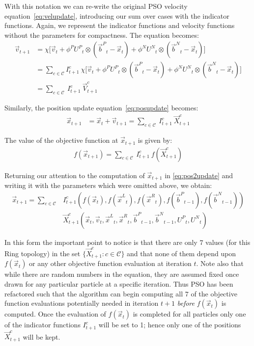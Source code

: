 \documentclass[ms]{byuprop}
\providecommand{\pers}{\ensuremath{P}}
\providecommand{\neigh}{\ensuremath{N}}
\providecommand{\leftind}{\ensuremath{L}}
\providecommand{\rightind}{\ensuremath{R}}
\providecommand{\nURand}{\ensuremath{U^\neigh}}
\providecommand{\pURand}{\ensuremath{U^\pers}}
\providecommand{\ppos}{\ensuremath{\Vec{x}}}
\providecommand{\pvel}{\ensuremath{\Vec{v}}}
\providecommand{\nbest}{\ensuremath{\Vec{b}^\neigh}}
\providecommand{\pbest}{\ensuremath{\Vec{b}^\pers}}
\providecommand{\constriction}{\ensuremath{\chi}}
\providecommand{\ncoeff}{\ensuremath{\phi^\neigh}}
\providecommand{\pcoeff}{\ensuremath{\phi^\pers}}
\providecommand{\ofunc}{\ensuremath{f}}
\providecommand{\indic}{\ensuremath{I}}
\providecommand{\specvel}{\ensuremath{\vec{V}}}
\providecommand{\specpos}{\ensuremath{\vec{X}}}
\providecommand{\leftn}{\ensuremath{\Vec{x}^\leftind}}
\providecommand{\rightn}{\ensuremath{\Vec{x}^\rightind}}
\providecommand{\caseset}{\ensuremath{\mathcal{C}}}
\providecommand{\casegen}{\ensuremath{c}}
\begin{document}
With this notation we can re-write the original PSO velocity
equation~\eqref{eq:velupdate}, introducing our sum over cases with the
indicator functions.  Again, we represent the indicator functions and velocity
functions without the parameters for compactness.  The equation becomes:
\begin{align}
\nonumber
	\pvel_{t+1} &=
		\constriction \bigl[ \pvel_t
			+ \pcoeff\pURand_{t}\otimes(\pbest_{t} - \ppos_{t})
			+ \ncoeff\nURand_{t}\otimes(\nbest_{t} -
			\ppos_{t}) \bigr] \\
\nonumber
	&= \sum_{c \in \caseset} \indic_{t+1}^{c} \ \constriction \bigl[ \pvel_t
			+ \pcoeff\pURand_{t}\otimes(\pbest_{t} - \ppos_{t})
			+ \ncoeff\nURand_{t}\otimes(\nbest_{t} -
			\ppos_{t}) \bigr]  \\
\label{eq:vel2update}
	&= \sum_{c \in \caseset} \ \indic_{t+1}^{c} \ \specvel_{t+1}^{c} 
\end{align}

Similarly, the position update equation~\eqref{eq:posupdate} becomes:
\begin{align}
\label{eq:pos2update}
	\ppos_{t+1} &= \ppos_{t} + \pvel_{t+1}
	= \sum_{c \in \caseset} \ \indic_{t+1}^{c} \ \specpos_{t+1}^{c} 
\end{align}

The value of the objective function at $\ppos_{t+1}$ is given by:
\begin{align}
\label{eq:val2update}
	\ofunc (\ppos_{t+1}) = \sum_{c \in \caseset} \ \indic_{t+1}^{c}
	\ \ofunc(\specpos_{t+1}^{c})
\end{align}

Returning our attention to the computation of $\ppos_{t+1}$ in
\eqref{eq:pos2update} and writing it with the parameters which were omitted
above, we obtain:
\begin{align}
\nonumber
  \ppos_{t+1} = \sum_{c \in \caseset}
	&\indic_{t+1}^{c}(\ofunc ( \ppos_{t} ) ,\ofunc(\leftn_{t}),
	\ofunc(\rightn_{t}) ,\ofunc(\pbest_{t-1}) ,\ofunc(\nbest_{t-1})) \\
\label{eq:val2updatelong}
	& \specpos_{t+1}^{c}(\ppos_{t},\pvel_{t},\leftn_{t},\rightn_{t},
	\pbest_{t-1},\nbest_{t-1},\pURand_{t}, \nURand_{t})
\end{align}

In this form the important point to notice is that there are only $7$ values
(for this Ring topology) in the set $\{\specpos_{t+1}^{\casegen}: \casegen \in
\caseset\}$ and that none of them depend upon $f(\ppos_t)$ or any other
objective function evaluation at iteration $t$.  Note also that while there are
random numbers in the equation, they are assumed fixed once drawn for any
particular particle at a specific iteration.  Thus PSO has been refactored such
that the algorithm can begin computing all $7$ of the objective function
evaluations potentially needed in iteration $t+1$ \emph{before} $f(\ppos_t)$ is
computed.  Once the evaluation of $f(\ppos_{t})$ is completed for all particles
only one of the indicator functions $\indic_{t+1}^{\casegen}$ will be set to 1;
hence only one of the positions $\specpos_{t+1}^\casegen$ will be kept.
\end{document}
